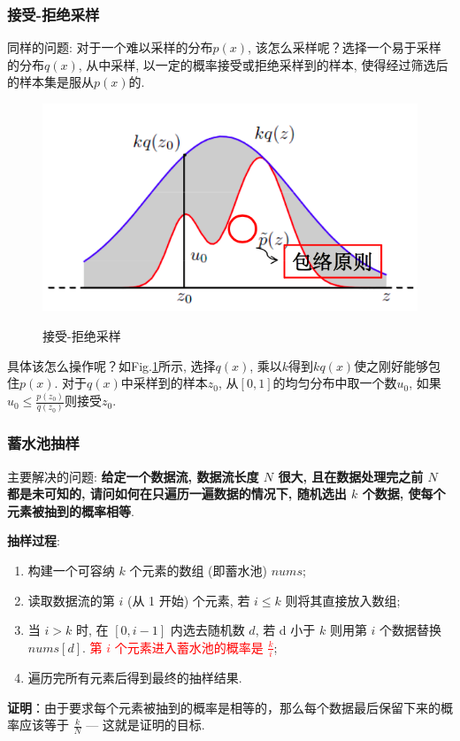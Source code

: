 \subsubsection{接受-拒绝采样}
同样的问题: 对于一个难以采样的分布$p(x)$, 该怎么采样呢？选择一个易于采样的分布$q(x)$, 从中采样, 以一定的概率接受或拒绝采样到的样本, 使得经过筛选后的样本集是服从$p(x)$的. 
\begin{figure}[h]
	\centering
	\includegraphics[width=.6\textwidth]{pics/accept-reject-sample.png}
	\label{fig:accept-reject-sample}
	\caption{接受-拒绝采样}
\end{figure}
具体该怎么操作呢？如Fig.\ref{fig:accept-reject-sample}所示, 选择$q(x)$, 乘以$k$得到$kq(x)$使之刚好能够包住$p(x)$. 对于$q(x)$中采样到的样本$z_0$, 从$[0, 1]$的均匀分布中取一个数$u_0$, 如果$u_0 \le \frac{p(z_0)}{q(z_0)}$则接受$z_0$. 

\subsubsection{蓄水池抽样}
主要解决的问题: \textbf{给定一个数据流, 数据流长度 $N$ 很大, 且在数据处理完之前 $N$ 都是未可知的, 请问如何在只遍历一遍数据的情况下, 随机选出 $k$ 个数据, 使每个元素被抽到的概率相等}.

\textbf{抽样过程}:
\begin{enumerate}
	\item 构建一个可容纳 $k$ 个元素的数组 (即蓄水池) $nums$;
	
	\item 读取数据流的第 $i$ (从 1 开始) 个元素, 若 $i \leq k$ 则将其直接放入数组;
	
	\item 当 $i > k$ 时, 在 $[0, i-1]$ 内选去随机数 $d$, 若 d 小于 $k$ 则用第 $i$ 个数据替换 $nums[d]$. \textcolor{red}{第 $i$ 个元素进入蓄水池的概率是 $\frac{k}{i}$};
	
	\item 遍历完所有元素后得到最终的抽样结果.
\end{enumerate}

\textbf{证明}：由于要求每个元素被抽到的概率是相等的，那么每个数据最后保留下来的概率应该等于 $\frac{k}{N}$ --- 这就是证明的目标. 

